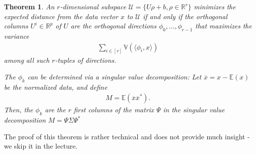 \documentclass{article}
\newcommand{\erw}{\mathbb{E}} %
\newcommand{\sprod}[1]{\langle #1 \rangle}
\newcommand{\calU}{\mathcal{U}}
\newcommand{\R}{\mathbb{R}}
\newtheorem{theorem}{Theorem}
\begin{document}
\begin{theorem}
   An $r$-dimensional subspace $\calU = \{U\rho+b, \rho \in \R^r\}$ minimizes the expected distance from the data vector $x$ to $\calU$ if and only if the orthogonal columns $U^i \in \R^p$ of $U$ are the orthogonal directions $\phi_0, \dots, \phi_{r-1}$ that maximizes the variance
   \begin{align} \label{eq:maxvar}
       \sum_{i \in [r]} \mathbb{V}(\sprod{\phi_i,x})
   \end{align}
   among all such $r$-tuples of directions.

   The $\phi_k$ can be determined via a singular value decomposition: Let $\overline{x}=x-\erw(x)$ be the normalized data, and define
   \begin{align*}
       M = \erw(\overline{x}\overline{x}^*).
   \end{align*}
    Then, the $\phi_k$ are the $r$ first columns of the matrix $\Psi$ in the singular value decomposition $M = \Psi \Sigma \Psi^*$
\end{theorem}

The proof of this theorem is rather technical and does not provide much insight - we skip it in the lecture.
\end{document}
